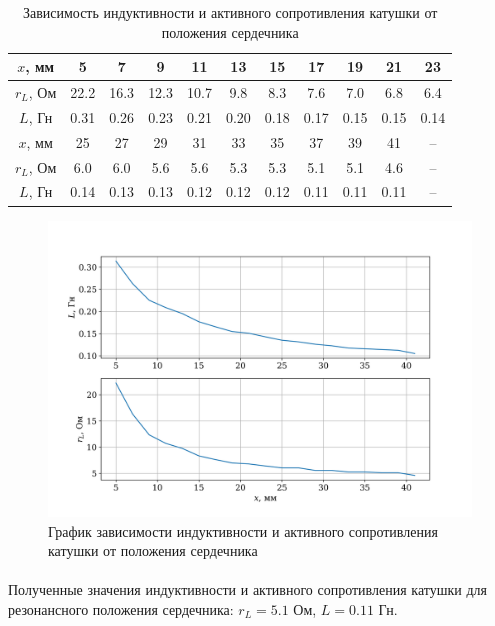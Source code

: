 \documentclass[a4paper,12pt]{article} %
\begin{document}
\begin{table}[h]
\begin{center}
\begin{tabular}{|c||c|c|c|c|c|c|c|c|c|c|}
\hline 
$x$, мм & 5 & 7 & 9 & 11 & 13 & 15 & 17 & 19 & 21 & 23 \\\hline
$r_L$, Ом & 22.2 & 16.3 & 12.3 & 10.7 & 9.8 & 8.3 & 7.6 & 7.0 & 6.8 & 6.4 \\\hline
$L$, Гн & 0.31 & 0.26 & 0.23 & 0.21 & 0.20 & 0.18 & 0.17 & 0.15 & 0.15 & 0.14 \\\hline
\hline
$x$, мм & 25 & 27 & 29 & 31 & 33 & 35 & 37 & 39 & 41 & -- \\\hline
$r_L$, Ом & 6.0 & 6.0 & 5.6 & 5.6 & 5.3 & 5.3 & 5.1 & 5.1 & 4.6 & -- \\\hline
$L$, Гн & 0.14 & 0.13 & 0.13 & 0.12 & 0.12 & 0.12 & 0.11 & 0.11 & 0.11 & -- \\\hline


\end{tabular} 
\caption{Зависимость индуктивности и активного сопротивления катушки от положения сердечника}
\label{tab:2}
\end{center}
\end{table}

\begin{figure}[h]
\begin{center}
\includegraphics[width=\textwidth]{plot1.png}
\caption{График зависимости индуктивности и активного сопротивления катушки от положения сердечника}
\label{fig:1}
\end{center}
\end{figure}

\paragraph{} Полученные значения индуктивности и активного сопротивления катушки для резонансного положения сердечника: $r_L = 5.1$ Ом, $L = 0.11$ Гн.
\end{document}
